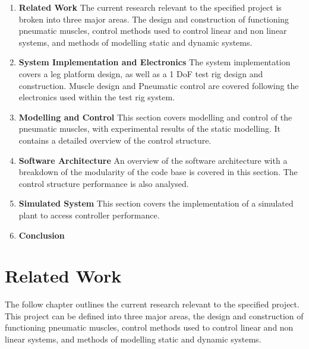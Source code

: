 \documentclass[11pt,a4paper]{article}
\begin{document}
\begin{enumerate}
\item \textbf{Related Work} The current research relevant to the specified project is broken into three major areas. The design and construction of functioning pneumatic muscles, control methods used to control linear and non linear systems, and methods of modelling static and dynamic systems.

\item \textbf{System Implementation and Electronics}
The system implementation covers a leg platform design, as well as a 1 DoF test rig design and construction. Muscle design and Pneumatic control are covered following the electronics used within the test rig system.

\item \textbf{Modelling and Control}
This section covers modelling and control of the pneumatic muscles, with experimental results of the static modelling. It contains a detailed overview of the control structure.

\item \textbf{Software Architecture}
An overview of the software architecture with a breakdown of the modularity of the code base is covered in this section. The control structure performance is also analysed.

\item \textbf{Simulated System}
This section covers the implementation of a simulated plant to access controller performance.

\item \textbf{Conclusion} 

\end{enumerate}

\clearpage
\section{Related Work}
\label{sec:related_work}

The follow chapter outlines the current research relevant to the specified project. This project can be defined into three major areas, the design and construction of functioning pneumatic muscles, control methods used to control linear and non linear systems, and methods of modelling static and dynamic systems. 
\end{document}
